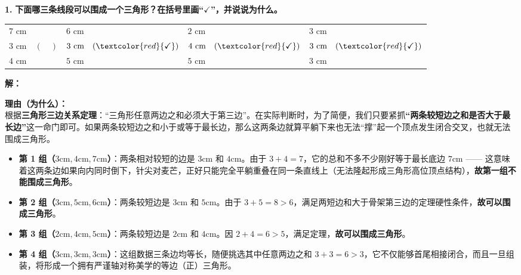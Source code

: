 \vspace{0.6cm}

\textbf{\LARGE 1.} \textbf{下面哪三条线段可以围成一个三角形？在括号里画“$\checkmark$”，并说说为什么。}

\vspace{0.4cm}

\begin{center}
\renewcommand{\arraystretch}{1.5}
\setlength{\tabcolsep}{15pt}
\begin{tabular}{llll}
$7\text{ cm}$ & $6\text{ cm}$ & $2\text{ cm}$ & $3\text{ cm}$ \\
$3\text{ cm} \quad (\quad)$ & $3\text{ cm} \quad (\textcolor{red}{\checkmark})$ & $4\text{ cm} \quad (\textcolor{red}{\checkmark})$ & $3\text{ cm} \quad (\textcolor{red}{\checkmark})$ \\
$4\text{ cm}$ & $5\text{ cm}$ & $5\text{ cm}$ & $3\text{ cm}$ \\
\end{tabular}
\end{center}

\vspace{0.4cm}
\textbf{解：}

\textbf{理由（为什么）：} \\
根据\textbf{三角形三边关系定理}：“三角形任意两边之和必须大于第三边”。在实际判断时，为了简便，我们只要紧抓\textbf{“两条较短边之和是否大于最长边”}这一命门即可。如果两条较短边之和小于或等于最长边，那么这两条边就算平躺下来也无法“撑”起一个顶点发生闭合交叉，也就无法围成三角形。
\begin{itemize}
    \item \textbf{第 1 组（$3\text{cm}, 4\text{cm}, 7\text{cm}$）}：两条相对较短的边是 $3\text{cm}$ 和 $4\text{cm}$。由于 $3 + 4 = 7$，它的总和不多不少刚好等于最长底边 $7\text{cm}$ —— 这意味着这两条边如果向内同时倒下，针尖对麦芒，正好只能完全平躺重叠在同一条直线上（无法隆起形成三角形高位顶点结构），\textbf{故第一组不能围成三角形}。
    \item \textbf{第 2 组（$3\text{cm}, 5\text{cm}, 6\text{cm}$）}：两条较短边是 $3\text{cm}$ 和 $5\text{cm}$。由于 $3 + 5 = 8 > 6$，满足两短边和大于骨架第三边的定理硬性条件，\textbf{故可以围成三角形}。
    \item \textbf{第 3 组（$2\text{cm}, 4\text{cm}, 5\text{cm}$）}：两条较短边是 $2\text{cm}$ 和 $4\text{cm}$。因 $2 + 4 = 6 > 5$，满足定理，\textbf{故可以围成三角形}。
    \item \textbf{第 4 组（$3\text{cm}, 3\text{cm}, 3\text{cm}$）}：这组数据三条边均等长，随便挑选其中任意两边之和 $3 + 3 = 6 > 3$，它不仅能够首尾相接闭合，而且一旦组装，将形成一个拥有严谨轴对称美学的等边（正）三角形。
\end{itemize}


